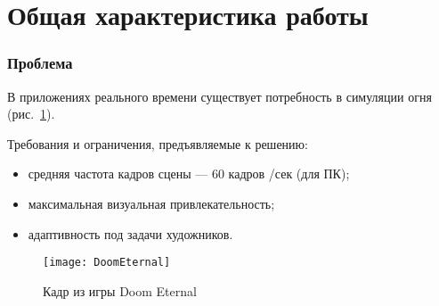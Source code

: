 \begin{frame}
\titlepage{}
\end{frame}

\section{Общая характеристика работы}

\begin{frame}
\frametitle{Проблема}
В приложениях реального времени существует потребность в симуляции огня
(рис.~\ref{fig:doomEternal}).

Требования и ограничения, предъявляемые к решению:
\begin{itemize}
    \item средняя частота кадров сцены --- 60 кадров /сек (для ПК);
    \item максимальная визуальная привлекательность;
    \item адаптивность под задачи художников.
\end{itemize}

\begin{figure}[htb]
	\centering
    \texttt{[image: DoomEternal]}
    \caption{Кадр из игры Doom Eternal}%
    \label{fig:doomEternal}
\end{figure}
\end{frame}

